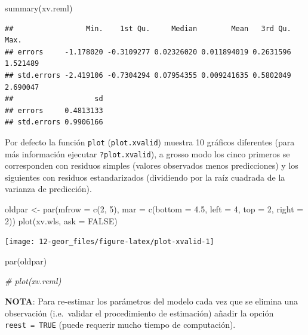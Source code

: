 \documentclass[
  spanish,
]{book}
\newenvironment{Shaded}{\begin{snugshade}}{\end{snugshade}}
\newcommand{\AttributeTok}[1]{\textcolor[rgb]{0.77,0.63,0.00}{#1}}
\newcommand{\CommentTok}[1]{\textcolor[rgb]{0.56,0.35,0.01}{\textit{#1}}}
\newcommand{\ConstantTok}[1]{\textcolor[rgb]{0.00,0.00,0.00}{#1}}
\newcommand{\DecValTok}[1]{\textcolor[rgb]{0.00,0.00,0.81}{#1}}
\newcommand{\FloatTok}[1]{\textcolor[rgb]{0.00,0.00,0.81}{#1}}
\newcommand{\FunctionTok}[1]{\textcolor[rgb]{0.00,0.00,0.00}{#1}}
\newcommand{\NormalTok}[1]{#1}
\newcommand{\OtherTok}[1]{\textcolor[rgb]{0.56,0.35,0.01}{#1}}
\theoremstyle{break}
\theoremstyle{definition}
\theoremstyle{definition}
\theoremstyle{definition}
\theoremstyle{definition}
\theoremstyle{remark}
\begin{document}
\begin{Shaded}
\begin{Highlighting}[]
\FunctionTok{summary}\NormalTok{(xv.reml)}
\end{Highlighting}
\end{Shaded}

\begin{verbatim}
##                 Min.    1st Qu.     Median        Mean   3rd Qu.     Max.
## errors     -1.178020 -0.3109277 0.02326020 0.011894019 0.2631596 1.521489
## std.errors -2.419106 -0.7304294 0.07954355 0.009241635 0.5802049 2.690047
##                   sd
## errors     0.4813133
## std.errors 0.9906166
\end{verbatim}

Por defecto la función \texttt{plot} (\texttt{plot.xvalid}) muestra 10 gráficos
diferentes (para más información ejecutar \texttt{?plot.xvalid}), a grosso modo
los cinco primeros se corresponden con residuos simples (valores
observados menos predicciones) y los siguientes con residuos
estandarizados (dividiendo por la raíz cuadrada de la varianza de
predicción).

\begin{Shaded}
\begin{Highlighting}[]
\NormalTok{oldpar }\OtherTok{\textless{}{-}} \FunctionTok{par}\NormalTok{(}\AttributeTok{mfrow =} \FunctionTok{c}\NormalTok{(}\DecValTok{2}\NormalTok{, }\DecValTok{5}\NormalTok{), }\AttributeTok{mar =} \FunctionTok{c}\NormalTok{(}\AttributeTok{bottom =} \FloatTok{4.5}\NormalTok{, }\AttributeTok{left =} \DecValTok{4}\NormalTok{, }\AttributeTok{top =} \DecValTok{2}\NormalTok{, }\AttributeTok{right =} \DecValTok{2}\NormalTok{))}
\FunctionTok{plot}\NormalTok{(xv.wls, }\AttributeTok{ask =} \ConstantTok{FALSE}\NormalTok{)}
\end{Highlighting}
\end{Shaded}

\begin{center}\texttt{[image: 12-geor\_files/figure-latex/plot-xvalid-1]} \end{center}

\begin{Shaded}
\begin{Highlighting}[]
\FunctionTok{par}\NormalTok{(oldpar)}

\CommentTok{\# plot(xv.reml)}
\end{Highlighting}
\end{Shaded}

\textbf{NOTA}: Para re-estimar los parámetros del modelo cada vez que se
elimina una observación (i.e.~validar el procedimiento de estimación)
añadir la opción \texttt{reest\ =\ TRUE} (puede requerir mucho tiempo de
computación).
\end{document}
